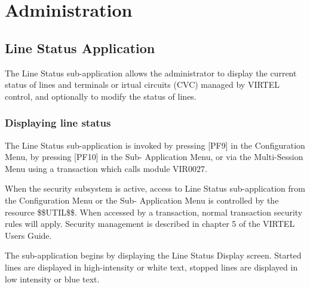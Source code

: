 \documentclass[letterpaper,10pt,english]{sphinxmanual}
\begin{document}
\chapter{Administration}
\label{\detokenize{audit_operations_ and_performance:administration}}\label{\detokenize{audit_operations_ and_performance:index-34}}
\ignorespaces 

\section{Line Status Application}
\label{\detokenize{audit_operations_ and_performance:line-status-application}}\label{\detokenize{audit_operations_ and_performance:index-35}}
The Line Status sub-application allows the administrator to display the current status of lines and terminals or irtual circuits (CVC) managed by VIRTEL control, and optionally to modify the status of lines.

\ignorespaces 

\subsection{Displaying line status}
\label{\detokenize{audit_operations_ and_performance:displaying-line-status}}\label{\detokenize{audit_operations_ and_performance:index-36}}
The Line Status sub-application is invoked by pressing {[}PF9{]} in the Configuration Menu, by pressing {[}PF10{]} in the Sub- Application Menu, or via the Multi-Session Menu using a transaction which calls module VIR0027.

When the security subsystem is active, access to Line Status sub-application from the Configuration Menu or the Sub- Application Menu is controlled by the resource \$\$UTIL\$\$.
When accessed by a transaction, normal transaction security rules will apply. Security management is described in chapter 5 of the VIRTEL Users Guide.

The sub-application begins by displaying the Line Status Display screen. Started lines are displayed in high-intensity or white text, stopped lines are displayed in low intensity or blue text.
\end{document}

